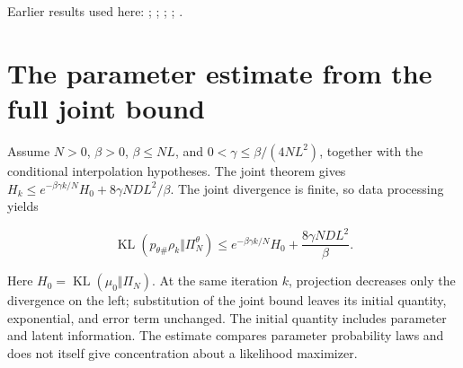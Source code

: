 \documentclass[11pt,a4paper]{article}
\begin{document}
Earlier results used here: \cite[Section~3.1.3]{LangevinLean2026ULALSI}; \cite[Section~3.34.1]{LangevinLean2026ULALSI}; \cite[Section~3.1.1]{LangevinLean2026IPLA}; \cite[Section~3.1.6]{LangevinLean2026IPLA}; \cite[Section~3.3.2]{LangevinLean2026IPLA}.

\section{\texorpdfstring{The parameter estimate from the full joint bound}{The parameter estimate from the full joint bound}}


Assume \(N>0\), \(\beta>0\), \(\beta\le NL\), and \(0<\gamma\le\beta/(4NL^2)\), together with the conditional interpolation hypotheses. The joint theorem gives \(H_k\le e^{-\beta\gamma k/N}H_0+8\gamma ND L^2/\beta\). The joint divergence is finite, so data processing yields

\[\operatorname{KL}(p_{\theta\#}\rho_k\Vert\Pi_N^\theta)\le e^{-\beta\gamma k/N}H_0+\frac{8\gamma ND L^2}{\beta}.\]

Here \(H_0=\operatorname{KL}(\mu_0\Vert\Pi_N)\). At the same iteration \(k\), projection decreases only the divergence on the left; substitution of the joint bound leaves its initial quantity, exponential, and error term unchanged. The initial quantity includes parameter and latent information. The estimate compares parameter probability laws and does not itself give concentration about a likelihood maximizer.
\end{document}
